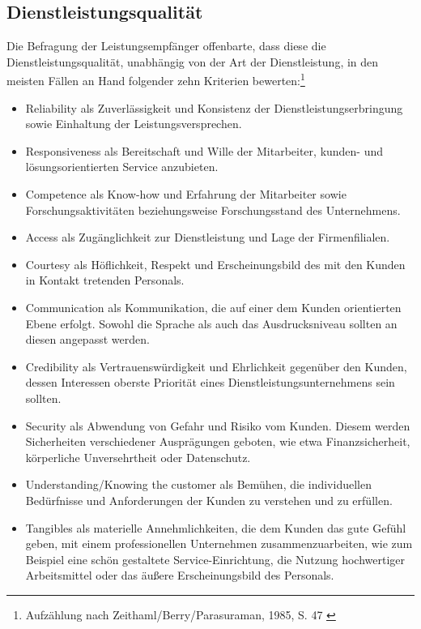 \subsection{Dienstleistungsqualität}
\label{dienstleistungsqualitaet}
Die Befragung der Leistungsempfänger offenbarte, dass diese die Dienstleistungsqualität, unabhängig von der Art der Dienstleistung, in den meisten Fällen an Hand folgender zehn Kriterien bewerten:\footnote{Aufzählung nach Zeithaml/Berry/Parasuraman, 1985, S. 47 \cite{Parasuraman_1985}}
\begin{itemize}
\item \glqq Reliability\grqq{} als Zuverlässigkeit und Konsistenz der Dienstleistungserbringung sowie Einhaltung der Leistungsversprechen.
\item \glqq Responsiveness\grqq{} als Bereitschaft und Wille der Mitarbeiter, kunden- und lösungsorientierten Service anzubieten.
\item \glqq Competence\grqq{} als Know-how und Erfahrung der Mitarbeiter sowie Forschungsaktivitäten beziehungsweise Forschungsstand des Unternehmens.
\item \glqq Access\grqq{} als Zugänglichkeit zur Dienstleistung und Lage der Firmenfilialen.
\item \glqq Courtesy\grqq{} als Höflichkeit, Respekt und Erscheinungsbild des mit den Kunden in Kontakt tretenden Personals.
\item \glqq Communication\grqq{} als Kommunikation, die auf einer dem Kunden orientierten Ebene erfolgt. Sowohl die Sprache als auch das Ausdrucksniveau sollten an diesen angepasst werden. 
\item \glqq Credibility\grqq{} als Vertrauenswürdigkeit und Ehrlichkeit gegenüber den Kunden, dessen Interessen oberste Priorität eines Dienstleistungsunternehmens sein sollten.
\item \glqq Security\grqq{} als Abwendung von Gefahr und Risiko vom Kunden. Diesem werden Sicherheiten verschiedener Ausprägungen geboten, wie etwa Finanzsicherheit, körperliche Unversehrtheit oder Datenschutz.
\item \glqq Understanding/Knowing the customer\grqq{} als Bemühen, die individuellen Bedürfnisse und Anforderungen der Kunden zu verstehen und zu erfüllen.
\item \glqq Tangibles\grqq{} als materielle Annehmlichkeiten, die dem Kunden das gute Gefühl geben, mit einem professionellen Unternehmen zusammenzuarbeiten, wie zum Beispiel eine schön gestaltete Service-Einrichtung, die Nutzung hochwertiger Arbeitsmittel oder das äußere Erscheinungsbild des Personals.
\end{itemize}
